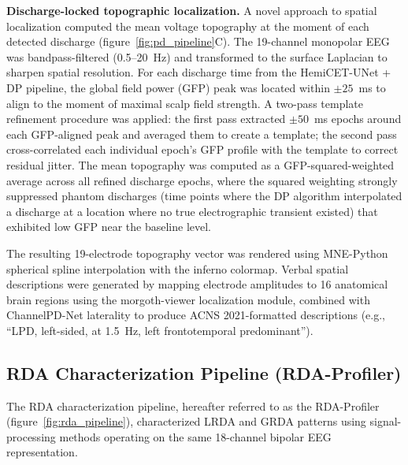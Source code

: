 \documentclass{iopjournal}
\begin{document}
\textbf{Discharge-locked topographic localization.} A novel approach to spatial localization computed the mean voltage topography at the moment of each detected discharge (figure~\ref{fig:pd_pipeline}C). The 19-channel monopolar EEG was bandpass-filtered (0.5--20~Hz) and transformed to the surface Laplacian to sharpen spatial resolution. For each discharge time from the HemiCET-UNet + DP pipeline, the global field power (GFP) peak was located within $\pm 25$~ms to align to the moment of maximal scalp field strength. A two-pass template refinement procedure was applied: the first pass extracted $\pm 50$~ms epochs around each GFP-aligned peak and averaged them to create a template; the second pass cross-correlated each individual epoch's GFP profile with the template to correct residual jitter. The mean topography was computed as a GFP-squared-weighted average across all refined discharge epochs, where the squared weighting strongly suppressed phantom discharges (time points where the DP algorithm interpolated a discharge at a location where no true electrographic transient existed) that exhibited low GFP near the baseline level.

The resulting 19-electrode topography vector was rendered using MNE-Python~\cite{gramfort2013} spherical spline interpolation with the inferno colormap. Verbal spatial descriptions were generated by mapping electrode amplitudes to 16 anatomical brain regions using the morgoth-viewer localization module, combined with ChannelPD-Net laterality to produce ACNS 2021-formatted descriptions (e.g., ``LPD, left-sided, at 1.5~Hz, left frontotemporal predominant'').

\subsection{RDA Characterization Pipeline (RDA-Profiler)}
\label{sec:rda_pipeline}

The RDA characterization pipeline, hereafter referred to as the RDA-Profiler (figure~\ref{fig:rda_pipeline}), characterized LRDA and GRDA patterns using signal-processing methods operating on the same 18-channel bipolar EEG representation.
\end{document}
